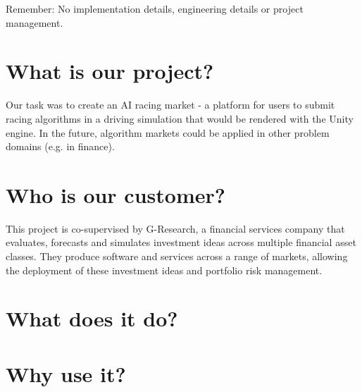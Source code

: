 Remember: No implementation details, engineering details or project management.

\section{What is our project?}
Our task was to create an AI racing market - a platform for users to submit racing algorithms in a driving simulation that would be rendered with the Unity engine. In the future, algorithm markets could be applied in other problem domains (e.g. in finance).

\section{Who is our customer?}
This project is co-supervised by G-Research, a financial services company that evaluates, forecasts and simulates investment ideas across multiple financial asset classes. They produce software and services across a range of markets, allowing the deployment of these investment ideas and portfolio risk management.

\section{What does it do?}
\section{Why use it?}
